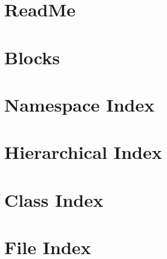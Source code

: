 \documentclass[twoside]{book}
\newcommand{\+}{\discretionary{\mbox{\scriptsize$\hookleftarrow$}}{}{}}
\begin{document}
\chapter{Read\+Me}
\label{md__c___program__files__x86___steam_steamapps_common_7__days__to__die__mods_working_0__s_core__read_me}

\chapter{Blocks}
\label{md__c___program__files__x86___steam_steamapps_common_7__days__to__die__mods_working_0__s_core__scripts__blocks__readme}

\chapter{Namespace Index}

\chapter{Hierarchical Index}

\chapter{Class Index}

\chapter{File Index}

\end{document}
